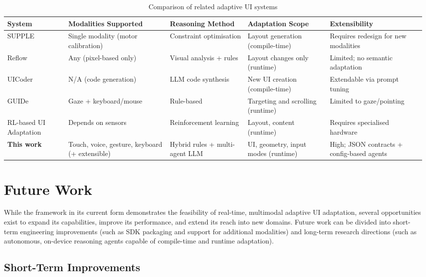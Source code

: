 \begin{table}[h]
\centering
\small
\caption{Comparison of related adaptive UI systems}
\label{tab:related-comparison}
\begin{tabular}{p{2cm}p{3cm}p{3cm}p{3cm}p{3cm}}
\toprule
\textbf{System} & \textbf{Modalities Supported} & \textbf{Reasoning Method} & \textbf{Adaptation Scope} & \textbf{Extensibility} \\
\midrule
SUPPLE & Single modality (motor calibration) & Constraint optimisation & Layout generation (compile-time) & Requires redesign for new modalities \\
Reflow & Any (pixel-based only) & Visual analysis + rules & Layout changes only (runtime) & Limited; no semantic adaptation \\
UICoder & N/A (code generation) & LLM code synthesis & New UI creation (compile-time) & Extendable via prompt tuning \\
GUIDe & Gaze + keyboard/mouse & Rule-based & Targeting and scrolling (runtime) & Limited to gaze/pointing \\
RL-based UI Adaptation & Depends on sensors & Reinforcement learning & Layout, content (runtime) & Requires specialised hardware \\
\textbf{This work} & Touch, voice, gesture, keyboard (+ extensible) & Hybrid rules + multi-agent LLM & UI, geometry, input modes (runtime) & High; JSON contracts + config-based agents \\
\bottomrule
\end{tabular}
\end{table}

\section{Future Work} 
While the framework in its current form demonstrates the feasibility of real-time, multimodal adaptive UI adaptation, several opportunities exist to expand its capabilities, improve its performance, and extend its reach into new domains. Future work can be divided into short-term engineering improvements (such as SDK packaging and support for additional modalities) and long-term research directions (such as autonomous, on-device reasoning agents capable of compile-time and runtime adaptation).

\subsection{Short-Term Improvements}

